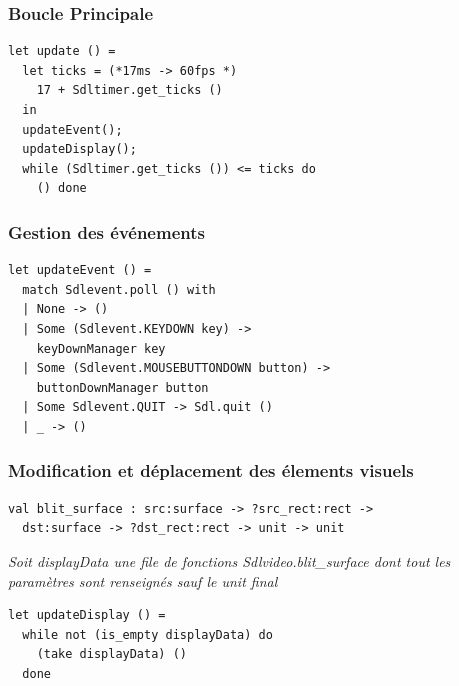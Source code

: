 \begin{frame}[fragile]
	\frametitle{Boucle Principale}
	\begin{lstlisting}
let update () =
  let ticks = (*17ms -> 60fps *) 
    17 + Sdltimer.get_ticks () 
  in
  updateEvent();
  updateDisplay();
  while (Sdltimer.get_ticks ()) <= ticks do 
    () done
	\end{lstlisting}
\end{frame}

\begin{frame}[fragile]
	\frametitle{Gestion des événements}
	\begin{lstlisting}
let updateEvent () = 
  match Sdlevent.poll () with
  | None -> ()
  | Some (Sdlevent.KEYDOWN key) -> 
    keyDownManager key
  | Some (Sdlevent.MOUSEBUTTONDOWN button) -> 
    buttonDownManager button
  | Some Sdlevent.QUIT -> Sdl.quit ()
  | _ -> ()
	\end{lstlisting}
\end{frame}

\begin{frame}[fragile]
	\frametitle{Modification et déplacement des élements visuels}
	\lstset{basicstyle=\scriptsize}
	\begin{lstlisting}
val blit_surface : src:surface -> ?src_rect:rect -> 
  dst:surface -> ?dst_rect:rect -> unit -> unit
	\end{lstlisting}
	\textit{Soit displayData une file de fonctions Sdlvideo.blit\_surface dont tout les paramètres sont renseignés sauf le unit final}
	\lstset{basicstyle=\normalsize}
	\begin{lstlisting}
let updateDisplay () = 
  while not (is_empty displayData) do
    (take displayData) ()
  done
	\end{lstlisting}
\end{frame}

